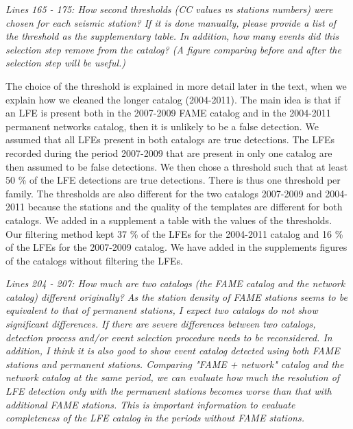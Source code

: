 \documentclass[letterpaper, 12pt]{article}
\begin{document}
\bigskip

\textit{Lines 165 - 175: How second thresholds (CC values vs stations numbers) were chosen for each seismic station? If it is done manually, please provide a list of the threshold as the supplementary table. In addition, how many events did this selection step remove from the catalog? (A figure comparing before and after the selection step will be useful.)}

\bigskip

The choice of the threshold is explained in more detail later in the text, when we explain how we cleaned the longer catalog (2004-2011). The main idea is that if an LFE is present both in the 2007-2009 FAME catalog and in the 2004-2011 permanent networks catalog, then it is unlikely to be a false detection. We assumed that all LFEs present in both catalogs are true detections. The LFEs recorded during the period 2007-2009 that are present in only one catalog are then assumed to be false detections. We then chose a threshold such that at least 50 \% of the LFE detections are true detections. There is thus one threshold per family. The thresholds are also different for the two catalogs 2007-2009 and 2004-2011 because the stations and the quality of the templates are different for both catalogs. We added in a supplement a table with the values of the thresholds. \\

Our filtering method kept 37 \% of the LFEs for the 2004-2011 catalog and 16 \% of the LFEs for the 2007-2009 catalog. We have added in the supplements figures of the catalogs without filtering the LFEs.

\bigskip

\textit{Lines 204 - 207: How much are two catalogs (the FAME catalog and the network catalog) different originally? As the station density of FAME stations seems to be equivalent to that of permanent stations, I expect two catalogs do not show significant differences. If there are severe differences between two catalogs, detection process and/or event selection procedure needs to be reconsidered. In addition, I think it is also good to show event catalog detected using both FAME stations and permanent stations. Comparing "FAME + network" catalog and the network catalog at the same period, we can evaluate how much the resolution of LFE detection only with the permanent stations becomes worse than that with additional FAME stations. This is important information to evaluate completeness of the LFE catalog in the periods without FAME stations.}
\end{document}
